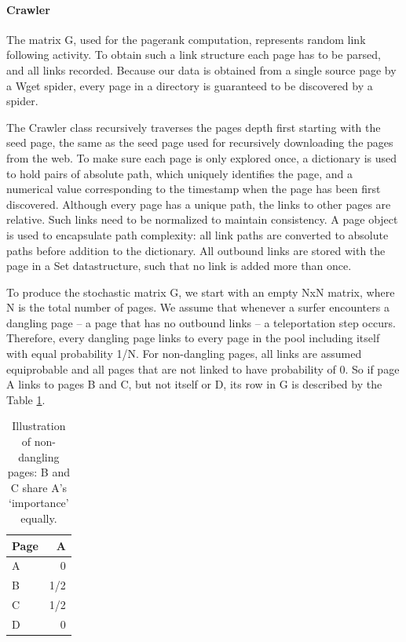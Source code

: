 \documentclass[12pt,twoside,notitlepage]{report}
\begin{document}
\paragraph{Crawler}
The matrix G, used for the pagerank computation, represents random link
following activity. To obtain such a link structure each page has to be parsed,
and all links recorded. Because our data is obtained from a single source page
by a Wget spider, every page in a directory is guaranteed to be discovered by a
spider.

The Crawler class recursively traverses the pages depth first starting with the seed page,
the same as the seed page used for recursively downloading the pages from the
web. To make sure each page is only explored once, a dictionary is used to
hold pairs of absolute path, which uniquely identifies the page, and a
numerical value corresponding to the timestamp when the page has been first
discovered.
Although every page has a unique path, the links to other pages are relative.
Such links need to be normalized to maintain consistency.
A page object is used to encapsulate path complexity: all link paths are
converted to absolute paths before addition to the dictionary.
All outbound links are stored with the page in a Set datastructure,
such that no link is added more than once. 

To produce the stochastic matrix G, we start with an empty NxN matrix, where N
is the total number of pages. We assume that whenever a surfer encounters a dangling page -- a page that has no
outbound links -- a teleportation step occurs. Therefore, every dangling page
links to every page in the pool including itself with equal probability 1/N. For non-dangling
pages, all links are assumed equiprobable and all pages that are not linked to
have probability of 0. So if page A links to pages B and C, but not itself or
D, its row in G is described by the Table \ref{tab}.

\begin{table}
    \begin{center}
      \begin{tabular}{|l|r|}
        \hline
        Page & A \\ \hline
         A &  0  \\ \hline
         B & 1/2 \\ \hline
         C & 1/2 \\ \hline
         D & 0   \\ \hline
      \end{tabular}
      \caption{Illustration of non-dangling pages: B and C share A's `importance' equally.\label{tab}}
  \end{center}
\end{table}
\end{document}
